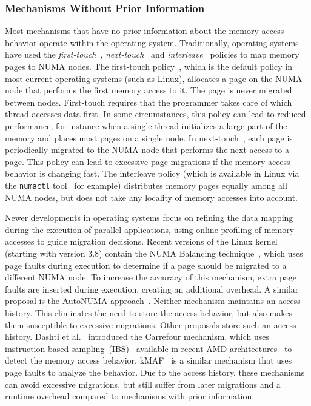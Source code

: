 \subsubsection{Mechanisms Without Prior Information}

Most mechanisms that have no prior information about the memory access behavior operate within the operating system.
Traditionally, operating systems have used the \emph{first-touch}~\cite{Marchetti1995}, \emph{next-touch}~\cite{Lof2005} and \emph{interleave}~\cite{Kleen2004} policies to map memory pages to NUMA nodes.
The first-touch policy~\cite{Marchetti1995}, which is the default policy in most current operating systems (such as Linux), allocates a page on the NUMA node that performs the first memory access to it.
The page is never migrated between nodes.
First-touch requires that the programmer takes care of which thread accesses data first.
In some circumstances, this policy can lead to reduced performance, for
instance when a single thread initializes a large part of the memory and places most pages on a single node.
In next-touch~\cite{Lof2005}, each page is periodically migrated to the NUMA node that performs the next access to a page.
This policy can lead to excessive page migrations if the memory access behavior is changing fast.
The interleave policy (which is available in Linux via the \texttt{numactl} tool~\cite{Kleen2004} for example) distributes memory pages equally among all NUMA nodes, but does not take any locality of memory accesses into account.

Newer developments in operating systems focus on refining the data mapping during the execution of parallel applications, using online profiling of memory accesses to guide migration decisions.
Recent versions of the Linux kernel (starting with version 3.8) contain the NUMA Balancing technique~\cite{Corbet}, which uses page faults during execution to determine if a page should be migrated to a different NUMA node. To increase the accuracy of this mechanism, extra page faults are inserted during execution, creating an additional overhead.
A similar proposal is the AutoNUMA approach~\cite{Corbet2012}.
Neither mechanism maintains an access history. This eliminates the need to store the access behavior, but also makes them susceptible to excessive migrations.
Other proposals store such an access history.
Dashti et al.~\cite{Dashti2013} introduced the Carrefour mechanism, which uses instruction-based sampling~(IBS)~\cite{Drongowski07Instructionbased} available in recent AMD architectures~\cite{AMD2012} to detect the memory access behavior.
kMAF~\cite{Diener2014} is a similar mechanism that uses page faults to analyze the behavior.
Due to the access history, these mechanisms can avoid excessive migrations, but still suffer from later migrations and a runtime overhead compared to mechanisms with prior information.

